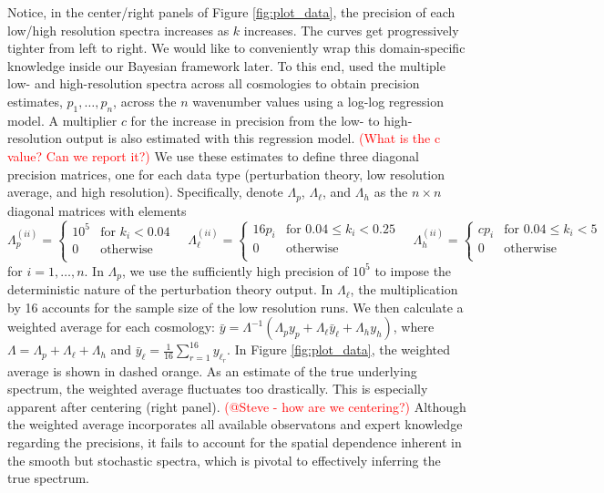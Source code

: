 \documentclass[11pt]{article}
\begin{document}
Notice, in the center/right panels of Figure \ref{fig:plot_data}, the precision of each
low/high resolution spectra increases as $k$ increases.  The curves get progressively 
tighter from left to right.  We would like to conveniently wrap this domain-specific 
knowledge inside our Bayesian framework later.  To this end, \cite{moran2023mira} 
used the multiple low- and high-resolution spectra across all cosmologies to
obtain precision estimates, $p_1,\dots, p_n$, across the $n$ 
wavenumber values using a log-log regression model. A multiplier $c$ for 
the increase in precision from the low- to high- resolution output is also 
estimated with this regression model. 
\textcolor{red}{(What is the c value?  Can we report it?)}
We use these estimates to define three 
diagonal precision matrices, one for each data type (perturbation theory, 
low resolution average, and high resolution). Specifically, denote $\Lambda_p$, 
$\Lambda_\ell$, and $\Lambda_h$ as the $n\times n$ diagonal matrices with elements
\[
\Lambda_p^{(ii)} = \begin{cases}
    10^5 &\text{for } k_i < 0.04 \\
    0  &\text{otherwise}\\
    \end{cases}
\quad
\Lambda_\ell^{(ii)} = \begin{cases}
    16p_i &\text{for } 0.04 \leq k_i < 0.25 \\
    0  &\text{otherwise}\\
    \end{cases}
\quad
\Lambda_h^{(ii)} = \begin{cases}
    cp_i &\text{for } 0.04 \leq k_i < 5 \\
    0  &\text{otherwise}\\
    \end{cases}
\]
for $i=1,\dots, n$.  In $\Lambda_p$, we use the sufficiently high precision 
of $10^5$ to impose the deterministic nature of the perturbation theory output.
In $\Lambda_\ell$, the multiplication by 16 accounts for the sample size of the
low resolution runs.
We then calculate a weighted average for each cosmology: 
$\bar y = \Lambda^{-1}(\Lambda_p y_p + \Lambda_{\ell} \bar{y}_\ell + \Lambda_h y_h)$, 
where $\Lambda = \Lambda_p + \Lambda_\ell + \Lambda_h$ and 
$\bar{y}_\ell = \frac{1}{16}\sum_{r=1}^{16} y_{\ell_r}$. In Figure \ref{fig:plot_data},
the weighted average is shown in dashed orange.  As an estimate of the true
underlying spectrum, the weighted average fluctuates too drastically.  
This is especially apparent after centering (right panel).
\textcolor{red}{(@Steve - how are we centering?)}
Although the weighted average incorporates all available observatons and 
expert knowledge regarding the precisions, it fails to account for the spatial 
dependence inherent in the smooth but stochastic spectra, which is pivotal to 
effectively inferring the true spectrum.
\end{document}

